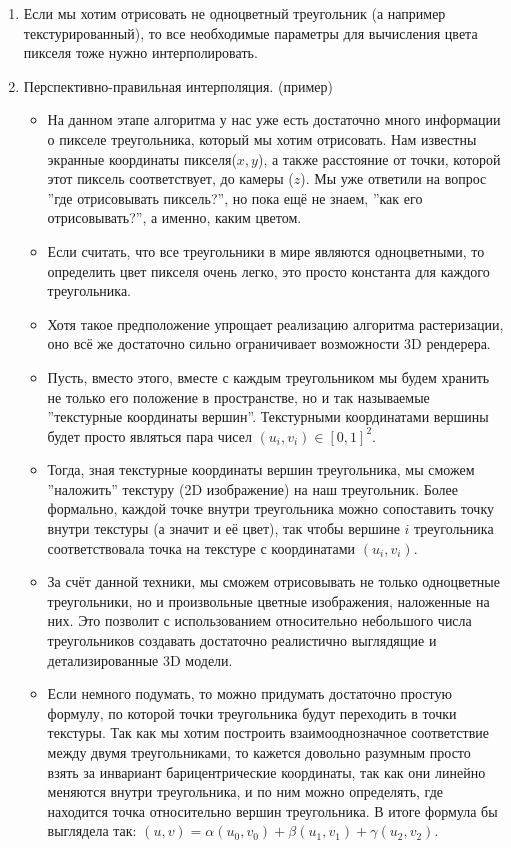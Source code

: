 \documentclass{article}
\begin{document}
\begin{enumerate}
	\item Если мы хотим отрисовать не одноцветный треугольник (а например текстурированный), то все необходимые параметры для вычисления цвета пикселя тоже нужно интерполировать. 
	\item Перспективно-правильная интерполяция. (пример)
	\begin{itemize}
		\item На данном этапе алгоритма у нас уже есть достаточно много информации о пикселе треугольника, который мы хотим отрисовать. Нам известны экранные координаты пикселя($x, y$), а также расстояние от точки, которой этот пиксель соответствует, до камеры ($z$). Мы уже ответили на вопрос ''где отрисовывать пиксель?'', но пока ещё не знаем, ''как его отрисовывать?'', а именно, каким цветом.
		\item Если считать, что все треугольники в мире являются одноцветными, то определить цвет пикселя очень легко, это просто константа для каждого треугольника.
		\item Хотя такое предположение упрощает реализацию алгоритма растеризации, оно всё же достаточно сильно ограничивает возможности 3D рендерера. 
		\item Пусть, вместо этого, вместе с каждым треугольником мы будем хранить не только его положение в пространстве, но и так называемые ''текстурные координаты вершин''. Текстурными координатами вершины будет просто являться пара чисел $(u_i, v_i)\in[0, 1]^2$. 
		\item Тогда, зная текстурные координаты вершин треугольника, мы сможем ''наложить'' текстуру (2D изображение) на наш треугольник. Более формально, каждой точке внутри треугольника можно сопоставить точку внутри текстуры (а значит и её цвет), так чтобы вершине $i$ треугольника соответствовала точка на текстуре с координатами $(u_i, v_i)$.
		\item За счёт данной техники, мы сможем отрисовывать не только одноцветные треугольники, но и произвольные цветные изображения, наложенные на них. Это позволит с использованием относительно небольшого числа треугольников создавать достаточно реалистично выглядящие и детализированные 3D модели.
		\item Если немного подумать, то можно придумать достаточно простую формулу, по которой точки треугольника будут переходить в точки текстуры. Так как мы хотим построить взаимооднозначное соответствие между двумя треугольниками, то кажется довольно разумным просто взять за инвариант барицентрические координаты, так как они линейно меняются внутри треугольника, и по ним можно определять, где находится точка относительно вершин треугольника. В итоге формула бы выглядела так: $(u, v) = \alpha(u_0, v_0)+\beta (u_1, v_1)+\gamma(u_2, v_2)$.

\end{itemize}
\end{enumerate}
\end{document}

